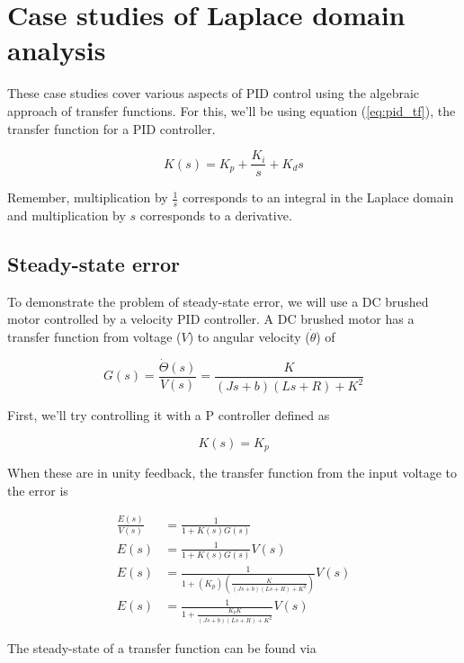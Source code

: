 \section{Case studies of Laplace domain analysis}

These case studies cover various aspects of PID control using the algebraic
approach of transfer functions. For this, we'll be using equation
(\ref{eq:pid_tf}), the transfer function for a PID controller.

\begin{equation}
  K(s) = K_p + \frac{K_i}{s} + K_ds \label{eq:pid_tf}
\end{equation}

Remember, multiplication by $\frac{1}{s}$ corresponds to an integral in the
Laplace domain and multiplication by $s$ corresponds to a derivative.

\subsection{Steady-state error}

To demonstrate the problem of \gls{steady-state error}, we will use a DC brushed
motor controlled by a velocity PID controller. A DC brushed motor has a transfer
function from voltage ($V$) to angular velocity ($\dot{\theta}$) of

\begin{equation}
  G(s) = \frac{\dot{\Theta}(s)}{V(s)} = \frac{K}{(Js+b)(Ls+R)+K^2}
\end{equation}

First, we'll try controlling it with a P controller defined as

\begin{equation*}
  K(s) = K_p
\end{equation*}

When these are in unity feedback, the transfer function from the input voltage
to the error is

\begin{align*}
  \frac{E(s)}{V(s)} &= \frac{1}{1 + K(s)G(s)} \\
  E(s) &= \frac{1}{1 + K(s)G(s)} V(s) \\
  E(s) &= \frac{1}{1 + (K_p) \left(\frac{K}{(Js+b)(Ls+R)+K^2}\right)} V(s) \\
  E(s) &= \frac{1}{1 + \frac{K_p K}{(Js+b)(Ls+R)+K^2}} V(s)
\end{align*}

The steady-state of a transfer function can be found via

